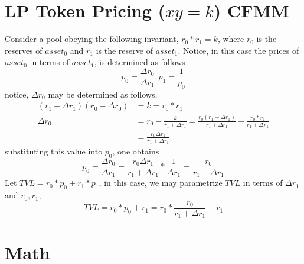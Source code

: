 \documentclass{amsart}
\numberwithin{equation}{section}
\theoremstyle{plain}
\theoremstyle{definition}
\begin{document}
\section{LP Token Pricing ($xy = k$) CFMM}
Consider a pool obeying the following invariant, $r_0 * r_1 = k$, where $r_0$ is the reserves of $asset_0$ and $r_1$ is the reserve of $asset_1$. Notice, in this case
the prices of $asset_0$ in terms of $asset_1$, is determined as follows
\begin{equation}
  p_0 = \frac{\Delta r_0}{\Delta r_1}, p_1 = \frac{1}{p_0}
\end{equation}
notice, $\Delta r_0$ may be determined as follows, 
\begin{align}
  (r_1 + \Delta r_1) (r_0 - \Delta r_0) &= k = r_0 * r_1 \\
  \Delta r_0 &= r_0 - \frac{k}{r_1 + \Delta r_1} = \frac{r_0(r_1 + \Delta r_1)}{r_1 + \Delta r_1} - \frac{r_0 * r_1}{r_1 + \Delta r_1} \\
  &= \frac{r_0 \Delta r_1}{r_1 + \Delta r_1}
\end{align}
substituting this value into $p_0$, one obtains
\begin{equation}
  p_0 = \frac{\Delta r_0}{\Delta r_1} = \frac{r_0 \Delta r_1}{r_1 + \Delta r_1} * \frac{1}{\Delta r_1} = \frac{r_0}{r_1 + \Delta r_1}
\end{equation}
Let $TVL = r_0 * p_0 + r_1 * p_1$, in this case, we may parametrize $TVL$ in terms of $\Delta r_1$ and $r_0, r_1$, 
\begin{equation} 
  TVL = r_0 * p_0 + r_1 = r_0 * \frac{r_0}{r_1 + \Delta r_1} + r_1
\end{equation}

\section{Math}
\end{document}
